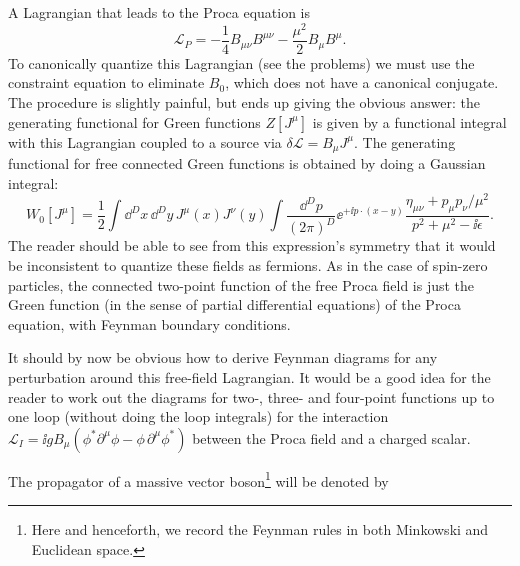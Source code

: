 A Lagrangian that leads to the Proca equation is
\begin{equation*}
  \mathcal{L}_P=-\frac14B_{\mu\nu}B^{\mu\nu}-\frac{\mu^2}{2}B_\mu B^\mu.
\end{equation*}
To canonically quantize this Lagrangian (see the problems) we must use the constraint
equation to eliminate $B_0$, which does not have a canonical conjugate. The procedure is
slightly painful, but ends up giving the obvious answer: the generating functional for
Green functions $Z[J^\mu]$ is given by a functional integral with this Lagrangian coupled to
a source via $\delta\mathcal{L}=B_\mu J^\mu$. The generating functional for free connected Green functions
is obtained by doing a Gaussian integral:
\begin{equation*}
  W_0[J^\mu]=\frac{1}{2}\int\dd^D x\,\dd^D y\,J^\mu(x)J^\nu(y)
  \int\frac{\dd^D p}{(2\pi)^D}\ee^{+\ii p\cdot(x-y)}
  \frac{\eta_{\mu\nu}+p_\mu p_\nu/\mu^2}{p^2+\mu^2-\ii\epsilon}.
\end{equation*}
The reader should be able to see from this expression’s symmetry that it would be
inconsistent to quantize these fields as fermions. As in the case of spin-zero particles,
the connected two-point function of the free Proca field is just the Green function
(in the sense of partial differential equations) of the Proca equation, with Feynman
boundary conditions.


It should by now be obvious how to derive Feynman diagrams for any perturbation
around this free-field Lagrangian. It would be a good idea for the reader to work out
the diagrams for two-, three- and four-point functions up to one loop (without doing
the loop integrals) for the interaction
$\mathcal{L}_I=\ii gB_\mu(\phi^*\partial^\mu\phi-\phi\,\partial^\mu\phi^*)$
between the Proca field and a charged scalar.

The propagator of a massive vector boson\footnote[3]{Here and henceforth, we record the Feynman rules in both Minkowski and Euclidean space.}
will be denoted by

\begin{center}

\end{center}

